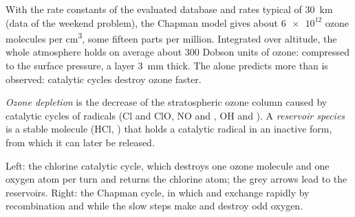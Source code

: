 With the rate constants of the evaluated database and  rates typical
of \qty{30}{km} (data of the weekend problem), the Chapman model gives about
$\num{6e12}$ ozone molecules per \unit{cm^3}, some fifteen parts per million. Integrated over
altitude, the whole atmosphere holds on average about 300 Dobson units of ozone:
compressed to the surface pressure, a layer \qty{3}{mm} thick. The 
alone predicts more than is observed: catalytic cycles destroy ozone faster.

\begin{definition}\label{def:b3:photochemistry:ozone-depletion}
\emph{Ozone depletion} is the decrease of the
stratospheric ozone column caused by catalytic cycles of radicals (Cl and ClO,
NO and , OH and ). A \emph{reservoir species}
is a stable molecule (HCl, ) that holds a catalytic radical in an inactive
form, from which it can later be released.
\end{definition}

\begin{omfigure}

{\small Left: the chlorine catalytic cycle, which destroys one ozone molecule and
one oxygen atom per turn and returns the chlorine atom; the grey arrows lead
to the reservoirs. Right: the Chapman cycle, in which  and  exchange
rapidly by recombination and  while the slow steps make and destroy
odd oxygen.}
\end{omfigure}

